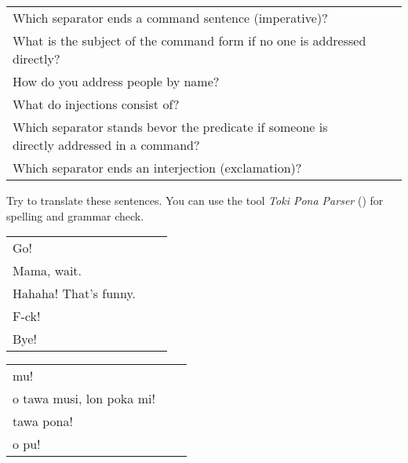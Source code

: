 \begin{supertabular}{p{5,5cm}|ll}
    Which separator ends a command sentence (imperative)?                                      &  & \\
    What is the subject of the command form if no one is addressed directly?                   &  & \\
    How do you address people by name?                                                         &  & \\
    What do injections consist of?                                                             &  & \\
    Which separator stands bevor  the predicate if someone is directly addressed in a command? &  & \\
    Which separator ends an interjection (exclamation)?                                        &  & \\
\end{supertabular}

Try to translate these sentences.
You can use the tool \textit{Toki Pona Parser} (\cite{www:rowa:02}) for spelling and grammar check.

\begin{supertabular}{p{5,5cm}|ll}
    Go!                   &  & \\
    Mama, wait.           &  & \\
    Hahaha! That's funny. &  & \\
    F-ck!                 &  & \\
    Bye!                  &  & \\
\end{supertabular}

\begin{supertabular}{p{5,5cm}|ll}
    mu!                       &  & \\
    o tawa musi, lon poka mi! &  & \\
    tawa pona!                &  & \\
    o pu!                     &  & \\
\end{supertabular}
